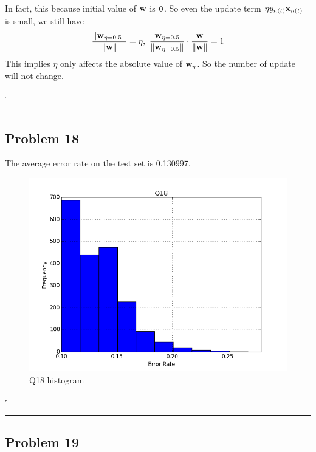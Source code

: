 \documentclass[12pt]{article}
\newcommand*{\QEDB}{\hfill\ensuremath{\square}}
\newcommand{\ParTh}[1]{\left(#1\right)}
\newcommand{\BF}[1]{{\bf#1}}
\newcommand{\VecAbsVal}[1]{\left\|#1\right\|}
\newcommand{\horrule}[1]{\rule{\linewidth}{#1}}
\begin{document}
In fact, this because initial value of $\BF{w}$ is $\BF{0}$. So even the update term $\eta y_{n\ParTh{t}}\BF{x}_{n\ParTh{t}}$ is small, we still have
\begin{align}
\dfrac{\VecAbsVal{\BF{w}_{\eta=0.5}}}{\VecAbsVal{\BF{w}}}=\eta, ~ \dfrac{\BF{w}_{\eta=0.5}}{\VecAbsVal{\BF{w}_{\eta=0.5}}}\cdot\dfrac{\BF{w}}{\VecAbsVal{\BF{w}}}=1
\end{align}
This implies $\eta$ only affects the absolute value of $\BF{w}_\eta$. So the number of update will not change.

\QEDB

\horrule{0.5pt}
\newpage
\subsection*{Problem 18}

The average error rate on the test set is 0.130997.
\begin{figure}[h]
\centering
\includegraphics[scale=0.3]{Q18}
\caption{Q18 histogram}
\label{Q18}
\end{figure}

\QEDB

\horrule{0.5pt}

\subsection*{Problem 19}
\end{document}
